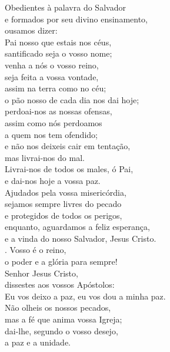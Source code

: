 \documentclass{book}
\begin{document}
\begin{flushleft}
    Obedientes à palavra do Salvador \\
    e formados por seu divino ensinamento, \\
    ousamos dizer:
    \vspace{.2cm} \\
    Pai nosso que estais nos céus, \\
    santificado seja o vosso nome; \\
    venha a nós o vosso reino, \\
    seja feita a vossa vontade, \\
    assim na terra como no céu; \\
    o pão nosso de cada dia nos dai hoje; \\
    perdoai-nos as nossas ofensas, \\
    assim como nós perdoamos \\
    a quem nos tem ofendido; \\
    e não nos deixeis cair em tentação, \\
    mas livrai-nos do mal.
    \vspace{.2cm} \\
    Livrai-nos de todos os males, ó Pai, \\
    e dai-nos hoje a vossa paz. \\
    Ajudados pela vossa misericórdia, \\
    sejamos sempre livres do pecado \\
    e protegidos de todos os perigos, \\
    enquanto, aguardamos a feliz esperança, \\
    e a vinda do nosso Salvador, Jesus Cristo.
    \vspace{.2cm} \\
    {\color{VioletRed2} \Rbar.} Vosso é o reino, \\ o poder e a glória para sempre!
    \vspace{.2cm} \\
    Senhor Jesus Cristo, \\
    dissestes aos vossos Apóstolos: \\
    Eu vos deixo a paz, eu vos dou a minha paz. \\
    Não olheis os nossos pecados, \\
    mas a fé que anima vossa Igreja; \\
    dai-lhe, segundo o vosso desejo, \\
    a paz e a unidade.

\end{flushleft}
\end{document}
